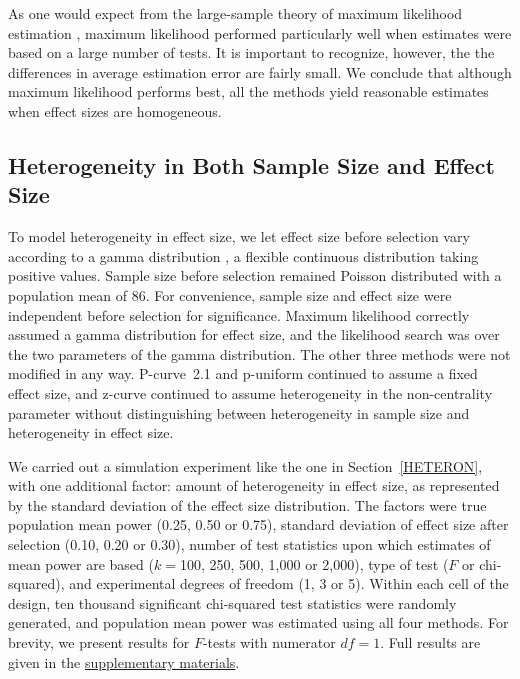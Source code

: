 \documentclass[jou]{apa6} %
\begin{document}
As one would expect from the large-sample theory of maximum likelihood estimation 
\parencite[][Ch.~6]{LehmanCasella1998}, maximum likelihood performed particularly well when estimates were based on a large number of tests. It is important to recognize, however, the the differences in average estimation error are fairly small. We conclude that although maximum likelihood performs best, all the methods yield reasonable estimates when effect sizes are homogeneous. 


\subsection{Heterogeneity in Both Sample Size and Effect Size} \label{HETERONES}

To model heterogeneity in effect size, we let effect size before selection vary according to a gamma distribution \parencite{JohnsonEtAl1995}, a flexible continuous distribution taking positive values. Sample size before selection remained Poisson distributed with a population mean of 86. For convenience, sample size and effect size were independent before selection for significance. Maximum likelihood correctly assumed a gamma distribution for effect size, and the likelihood search was over the two parameters of the gamma distribution. The other three methods were not modified in any way. P-curve~2.1 and p-uniform continued to assume a fixed effect size, and z-curve continued to assume heterogeneity in the non-centrality parameter without distinguishing between heterogeneity in sample size and heterogeneity in effect size.

We carried out a simulation experiment like the one in Section~\ref{HETERON},
with one additional factor: amount of heterogeneity in effect size, as represented by the standard deviation of the effect size distribution. The factors were true population mean power (0.25, 0.50 or 0.75), standard deviation of effect size after selection (0.10, 0.20 or 0.30), number of test statistics upon which estimates of mean power are based ($k=$100, 250, 500, 1,000 or 2,000), type of test ($F$ or chi-squared), and experimental degrees of freedom (1, 3 or 5). Within each cell of the design, ten thousand significant chi-squared test statistics were randomly generated, and population mean power was estimated using all four methods. For brevity, we present results for $F$-tests with numerator $df=1$. Full results are given in the \href{http://www.utstat.toronto.edu/~brunner/zcurve2018} {supplementary materials}. 
\end{document}
